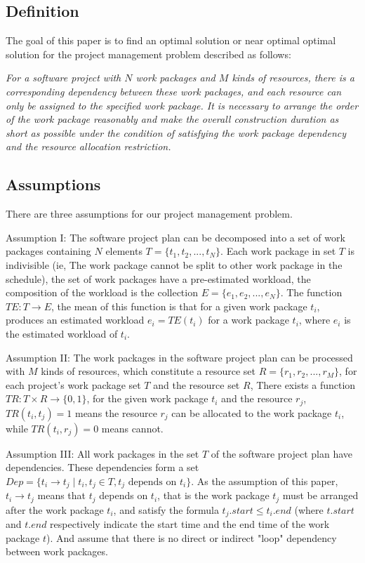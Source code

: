 \subsection{Definition}
%
The goal of this paper is to find an optimal solution or near optimal optimal
solution for the project management problem described as follows:


\emph{
  For a software project with $N$ work packages and $M$ kinds of resources,
  there is a corresponding dependency between these work packages, and each
  resource can only be assigned to the specified work package.  It is necessary
  to arrange the order of the work package reasonably and make the overall
  construction duration as short as possible under the condition of satisfying
  the work package dependency and the resource allocation restriction.
}


\subsection{Assumptions}
%
There are three assumptions for our project management problem.


Assumption I: The software project plan can be decomposed into a set of
work packages containing $N$ elements $T = \{t_1, t_2, ..., t_N \}$.
Each work package in set $T$ is indivisible (ie, The work package cannot be
split to other work package in the schedule), the set of work packages have a
pre-estimated workload, the composition of the workload is the collection
$E = \{e _1, e_2, ..., e_N \}$. The function $TE: T \rightarrow E$,
the mean of this function is that for a given work package $t_i$, produces an
estimated workload $e_i = TE(t_i)$ for a work package $t_i$, where $e_i$ is the
estimated workload of $t_i$.


Assumption II: The work packages in the software project plan can be
processed with $M$ kinds of resources, which constitute a resource set
$R = \{r_1, r_2, ..., r_M \}$, for each project's work package set $T$ and the
resource set $R$, There exists a function $TR: T \times R \rightarrow \{0, 1\}$,
for the given work package $t_i$ and the resource $r_j$, $TR(t_i, t_j) = 1$
means the resource $r_j$ can be allocated to the work package $t_i$, while
$TR(t_i, r_j) = 0$ means cannot.


Assumption III: All work packages in the set $T$ of the software project
plan have dependencies. These dependencies form a set
$Dep= \{t_i \rightarrow t_j \mid t_i, t_j \in T, t_j \text{ depends on } t_i\}$.
As the assumption of this paper, $t_i \rightarrow t_j$ means that $t_j$ depends
on $t_i$, that is the work package $t_j$ must be arranged after the work
package $t_i$, and satisfy the formula $t_j.start \leq t_i.end$ (where $t.start$
and $t.end$ respectively indicate the start time and the end time of the work
package $t$).  And assume that there is no direct or indirect "loop" dependency
between work packages.


